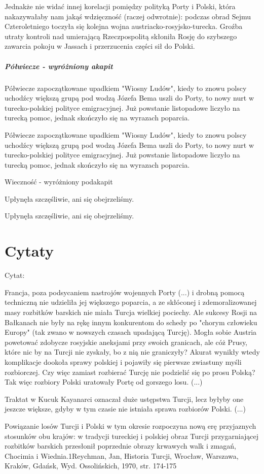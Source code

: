 Jednakże nie widać innej korelacji pomiędzy polityką Porty i Polski,
która nakazywałaby nam jakąś wdzięczność (raczej odwrotnie): podczas
obrad Sejmu Czteroletniego toczyła się kolejna wojna
austriacko-rosyjsko-turecka. Groźba utraty kontroli nad umierającą
Rzeczpospolitą skłoniła Rosję do szybszego zawarcia pokoju w Jassach i
przerzucenia części sił do Polski.

\hypertarget{puxf3ux142wiecze---wyruxf3ux17cniony-akapit}{%
\subparagraph{Półwiecze - wyróżniony
akapit}\label{puxf3ux142wiecze---wyruxf3ux17cniony-akapit}}

Półwiecze zapoczątkowane upadkiem "Wiosny Ludów", kiedy to znowu polscy
uchodźcy większą grupą pod wodzą Józefa Bema uszli do Porty, to nowy
nurt w turecko-polskiej polityce emigracyjnej. Już powstanie listopadowe
liczyło na turecką pomoc, jednak skończyło się na wyrazach poparcia.

Półwiecze zapoczątkowane upadkiem "Wiosny Ludów", kiedy to znowu polscy
uchodźcy większą grupą pod wodzą Józefa Bema uszli do Porty, to nowy
nurt w turecko-polskiej polityce emigracyjnej. Już powstanie listopadowe
liczyło na turecką pomoc, jednak skończyło się na wyrazach poparcia.

Wieczność - wyróżniony podakapit

Upłynęła szczęśliwie, ani się obejrzeliśmy.

Upłynęła szczęśliwie, ani się obejrzeliśmy.

\hypertarget{cytaty}{%
\section*{Cytaty}\label{cytaty}}

Cytat:

Francja, poza podsycaniem nastrojów wojennych Porty (...) i drobną
pomocą techniczną nie udzieliła jej większego poparcia, a ze skłóconej i
zdemoralizowanej masy rozbitków barskich nie miała Turcja wielkiej
pociechy. Ale sukcesy Rosji na Bałkanach nie były na rękę innym
konkurentom do schedy po "chorym człowieku Europy" (tak zwano w nowszych
czasach upadającą Turcję). Mogła sobie Austria powetować zdobycze
rosyjskie aneksjami przy swoich granicach, ale cóż Prusy, które nic by
na Turcji nie zyskały, bo z nią nie graniczyły? Akurat wynikły wtedy
komplikacje dookoła sprawy polskiej i pojawiły się pierwsze zwiastuny
myśli rozbiorczej. Czy więc zamiast rozbierać Turcję nie podzielić się
po prosu Polską? Tak więc rozbiory Polski uratowały Portę od gorszego
losu. (...)

Traktat w Kucuk Kayanarci oznaczał duże ustępstwa Turcji, lecz byłyby
one jeszcze większe, gdyby w tym czasie nie istniała sprawa rozbiorów
Polski. (...)

Powiązanie losów Turcji i Polski w tym okresie rozpoczyna nową erę
przyjaznych stosunków obu krajów: w tradycji tureckiej i polskiej obraz
Turcji przygarniającej rozbitków barskich przesłonił poprzednie obrazy
krwawych walk i zmagań, Chocimia i Wiednia.1Reychman, Jan, Historia
Turcji, Wrocław, Warszawa, Kraków, Gdańsk, Wyd. Ossolińskich, 1970, str.
174-175
